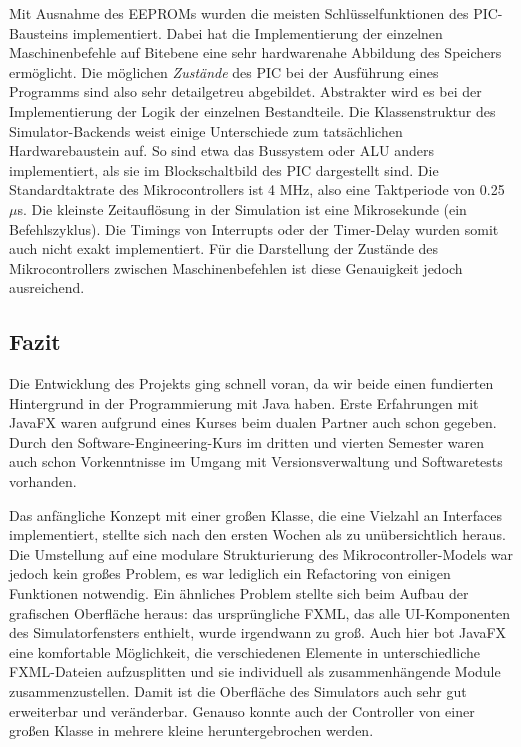 \documentclass[a4paper]{article}
\begin{document}
Mit Ausnahme des EEPROMs wurden die meisten Schlüsselfunktionen des PIC-Bausteins implementiert.
Dabei hat die Implementierung der einzelnen Maschinenbefehle auf Bitebene eine sehr hardwarenahe Abbildung des Speichers ermöglicht.
Die möglichen \textit{Zustände} des PIC bei der Ausführung eines Programms sind also sehr detailgetreu abgebildet.
Abstrakter wird es bei der Implementierung der Logik der einzelnen Bestandteile.
Die Klassenstruktur des Simulator-Backends weist einige Unterschiede zum tatsächlichen Hardwarebaustein auf.
So sind etwa das Bussystem oder ALU anders implementiert, als sie im Blockschaltbild des PIC dargestellt sind.
Die Standardtaktrate des Mikrocontrollers ist 4 MHz, also eine Taktperiode von 0.25 $\mu$s.
Die kleinste Zeitauflösung in der Simulation ist eine Mikrosekunde (ein Befehlszyklus).
Die Timings von Interrupts oder der Timer-Delay wurden somit auch nicht exakt implementiert.
Für die Darstellung der Zustände des Mikrocontrollers zwischen Maschinenbefehlen ist diese Genauigkeit jedoch ausreichend.

\subsection{Fazit}

Die Entwicklung des Projekts ging schnell voran, da wir beide einen fundierten Hintergrund in der Programmierung mit Java haben.
Erste Erfahrungen mit JavaFX waren aufgrund eines Kurses beim dualen Partner auch schon gegeben.
Durch den Software-Engineering-Kurs im dritten und vierten Semester waren auch schon Vorkenntnisse im Umgang mit Versionsverwaltung und Softwaretests vorhanden.

Das anfängliche Konzept mit einer großen Klasse, die eine Vielzahl an Interfaces implementiert, stellte sich nach den ersten Wochen als zu unübersichtlich heraus.
Die Umstellung auf eine modulare Strukturierung des Mikrocontroller-Models war jedoch kein großes Problem, es war lediglich ein Refactoring von einigen Funktionen notwendig.
Ein ähnliches Problem stellte sich beim Aufbau der grafischen Oberfläche heraus: das ursprüngliche FXML, das alle UI-Komponenten des Simulatorfensters enthielt, wurde irgendwann zu groß.
Auch hier bot JavaFX eine komfortable Möglichkeit, die verschiedenen Elemente in unterschiedliche FXML-Dateien aufzusplitten und sie individuell als zusammenhängende Module zusammenzustellen.
Damit ist die Oberfläche des Simulators auch sehr gut erweiterbar und veränderbar.
Genauso konnte auch der Controller von einer großen Klasse in mehrere kleine heruntergebrochen werden.
\end{document}
